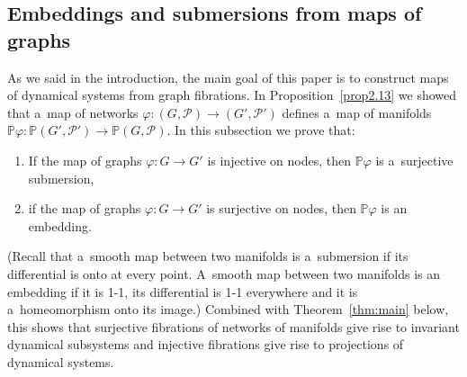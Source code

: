 \documentclass[pdftex]{sigma}
\numberwithin{equation}{section}
\begin{document}
\subsection{Embeddings and submersions from maps of graphs}

As we said in the introduction, the main goal of this paper is to construct maps of dynamical systems from graph
f\/ibrations.
In Proposition~\ref{prop2.13} we showed that a~map of networks $\varphi\colon (G,{\mathcal P})\to (G', {\mathcal P}')$
def\/ines a~map of manifolds $\mathbb{P} \varphi \colon \mathbb{P} (G', {\mathcal P}') \to \mathbb{P} (G,{\mathcal P})$.
In this subsection we prove that:
\begin{enumerate}\itemsep=0pt
\item[1)] If the map of graphs $\varphi\colon G\to G'$ is injective on nodes, then $\mathbb{P} \varphi$ is a~surjective
submersion,
\item[2)] if the map of graphs $\varphi\colon G\to G'$ is surjective on nodes, then $\mathbb{P} \varphi$ is an embedding.
\end{enumerate}
(Recall that a~smooth map between two manifolds is a~submersion if its dif\/ferential is onto at every point.
A~smooth map between two manifolds is an embedding if it is 1-1, its dif\/ferential is 1-1 everywhere and it is
a~homeomorphism onto its image.) Combined with Theorem~\ref{thm:main} below, this shows that surjective f\/ibrations of
networks of manifolds give rise to invariant dynamical subsystems and injective f\/ibrations give rise to projections of
dynamical systems.
\end{document}
